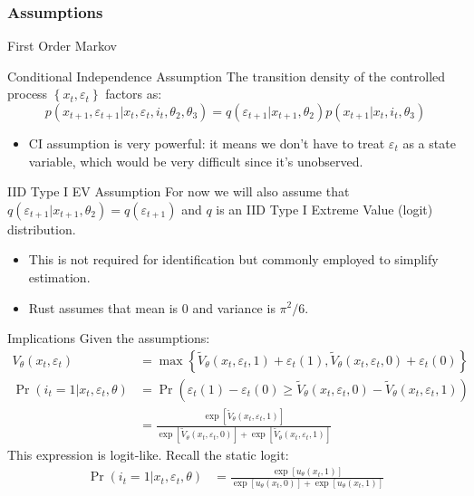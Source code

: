 \documentclass[aspectratio=169,11pt]{beamer}
\begin{document}
\begin{frame}
\frametitle{Assumptions}
\footnotesize
\begin{block}{First Order Markov}\end{block}
\begin{block}{Conditional Independence Assumption}
The transition density of the controlled process $\left\{x_{t},\varepsilon_{t}\right\}$ factors as:\[
p\left(x_{t+1},\varepsilon_{t+1}|x_{t},\varepsilon_{t},i_{t},\theta_{2},\theta_{3}\right)
= q\left(\varepsilon_{t+1}|x_{t+1},\theta_{2}\right)p\left(x_{t+1}|x_{t},i_{t},\theta_{3}\right)
\]
\end{block}

\begin{itemize}
	\item CI assumption is very powerful: it means we don't have to treat $\varepsilon_{t}$ as
	a state variable, which would be very difficult since it's unobserved.
\end{itemize}
\begin{block}{IID Type I EV Assumption}
For now we will also assume that $ q\left(\varepsilon_{t+1}|x_{t+1},\theta_{2}\right) =  q\left(\varepsilon_{t+1}\right)$ and $q$ is an IID Type I Extreme Value (logit) distribution.
\end{block}
\begin{itemize}
\item This is not required for identification but commonly employed to simplify estimation.
\item Rust assumes that mean is $0$ and variance is $\pi^2/6$.
\end{itemize}
\end{frame}



\begin{frame}{ Implications}
Given the assumptions:
\begin{align*}
V_{\theta}(x_t,\varepsilon_t) &= \max \left\{ \tilde V_{\theta} (x_t, \varepsilon_t, 1) + \varepsilon_{t}(1) ,\tilde V_{\theta} (x_t, \varepsilon_t, 0) + \varepsilon_{t}(0) \right\}\\
\Pr(i_t=1 | x_t,\varepsilon_t,\theta) &= \Pr\left(\varepsilon_{t}(1) - \varepsilon_{t}(0) \geq \tilde V_{\theta} (x_t, \varepsilon_t, 0) - \tilde V_{\theta} (x_t, \varepsilon_t, 1) \right) \\
&= \frac {\exp[\tilde V_{\theta} (x_t, \varepsilon_t, 1)]  }{\exp[\tilde V_{\theta} (x_t, \varepsilon_t, 0)] + \exp[\tilde V_{\theta} (x_t, \varepsilon_t, 1)]} 
\end{align*}
This expression is logit-like. Recall the static logit:
\begin{align*}
\Pr(i_t=1 | x_t,\varepsilon_t,\theta) &= \frac {\exp[u_{\theta} (x_t, 1)]  }{\exp[u_{\theta} (x_t, 0)] + \exp[u_{\theta} (x_t, 1)]} 
\end{align*}
\end{frame}
\end{document}
